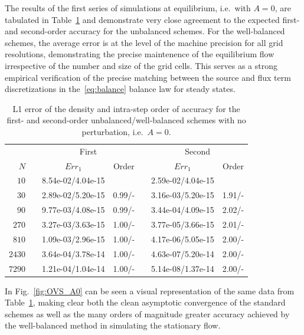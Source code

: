 The results of the first series of simulations at equilibrium, i.e.\ with $A=0$, are tabulated in Table~\ref{table:OVS_A0} and demonstrate very close agreement to the expected first- and second-order accuracy for the unbalanced schemes. For the well-balanced schemes, the average error is at the level of the machine precision for all grid resolutions, demonstrating the precise maintenence of the equilibrium flow irrespective of the number and size of the grid cells. This serves as a strong empirical verification of the precise matching between the source and flux term discretizations in the~\eqref{eq:balance} balance law for steady states.

\begin{table}\centering
\caption{L1 error of the density and intra-step order of accuracy for the first- and second-order unbalanced/well-balanced schemes with no perturbation, i.e.\ $A=0$.}
\label{table:OVS_A0}
\begin{tabular}{@{}rcccccc@{}}\toprule
& \phantom{a} & \multicolumn{2}{c}{First} & \phantom{ab} & \multicolumn{2}{c}{Second}\\
\cmidrule{3-4} \cmidrule{6-7}
$N$ && $Err_1$ & Order && $Err_1$ & Order\\ \midrule
$10$ && 8.54e-02/4.04e-15 &&& 2.59e-02/4.04e-15 &\\
$30$ && 2.89e-02/5.20e-15 & 0.99/- && 3.16e-03/5.20e-15 & 1.91/-\\
$90$ && 9.77e-03/4.08e-15 & 0.99/- && 3.44e-04/4.09e-15 & 2.02/-\\
$270$ && 3.27e-03/3.63e-15 & 1.00/- && 3.77e-05/3.66e-15 & 2.01/-\\
$810$ && 1.09e-03/2.96e-15 & 1.00/- && 4.17e-06/5.05e-15 & 2.00/-\\
$2430$ && 3.64e-04/3.78e-14 & 1.00/- && 4.63e-07/5.20e-14 & 2.00/-\\
$7290$ && 1.21e-04/1.04e-14 & 1.00/- && 5.14e-08/1.37e-14 & 2.00/-\\
\bottomrule
\end{tabular}
\end{table}

In Fig.~\ref{fig:OVS_A0} can be seen a visual representation of the same data from Table~\ref{table:OVS_A0}, making clear both the clean asymptotic convergence of the standard schemes as well as the many orders of magnitude greater accuracy achieved by the well-balanced method in simulating the stationary flow.

